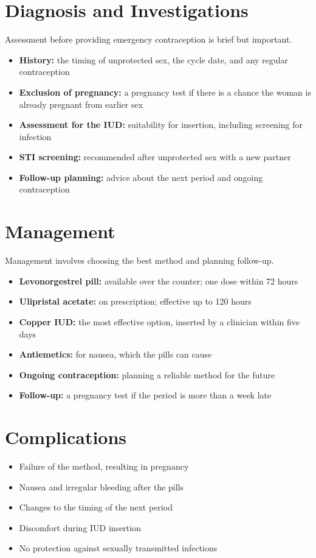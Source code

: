 \section*{Diagnosis and Investigations}
Assessment before providing emergency contraception is brief but important.
\begin{itemize}
    \item \textbf{History:} the timing of unprotected sex, the cycle date, and any regular contraception
    \item \textbf{Exclusion of pregnancy:} a pregnancy test if there is a chance the woman is already pregnant from earlier sex
    \item \textbf{Assessment for the IUD:} suitability for insertion, including screening for infection
    \item \textbf{STI screening:} recommended after unprotected sex with a new partner
    \item \textbf{Follow-up planning:} advice about the next period and ongoing contraception
\end{itemize}

\section*{Management}
Management involves choosing the best method and planning follow-up.
\begin{itemize}
    \item \textbf{Levonorgestrel pill:} available over the counter; one dose within 72 hours
    \item \textbf{Ulipristal acetate:} on prescription; effective up to 120 hours
    \item \textbf{Copper IUD:} the most effective option, inserted by a clinician within five days
    \item \textbf{Antiemetics:} for nausea, which the pills can cause
    \item \textbf{Ongoing contraception:} planning a reliable method for the future
    \item \textbf{Follow-up:} a pregnancy test if the period is more than a week late
\end{itemize}

\section*{Complications}
\begin{itemize}
    \item Failure of the method, resulting in pregnancy
    \item Nausea and irregular bleeding after the pills
    \item Changes to the timing of the next period
    \item Discomfort during IUD insertion
    \item No protection against sexually transmitted infections
\end{itemize}

